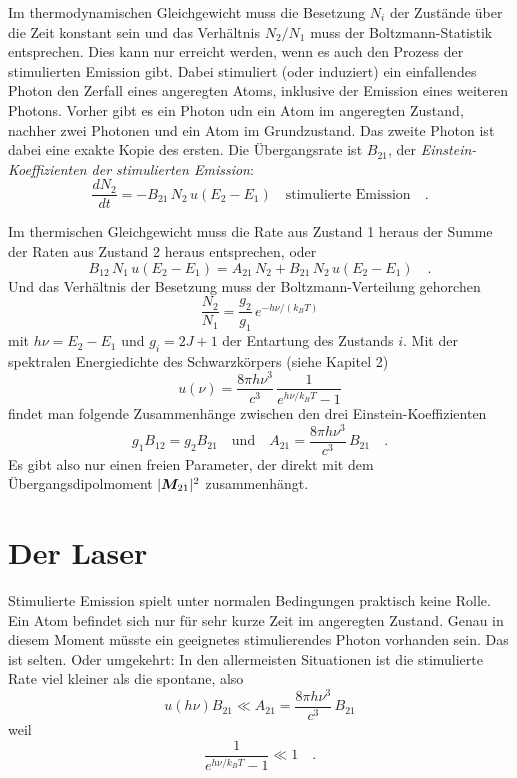 Im thermodynamischen Gleichgewicht muss die Besetzung $N_i$ der Zustände über die Zeit konstant sein und das Verhältnis $N_2 / N_1$ muss der Boltzmann-Statistik entsprechen. Dies kann nur erreicht werden, wenn es auch den  Prozess der stimulierten Emission gibt. Dabei stimuliert  (oder induziert) ein einfallendes Photon den Zerfall eines angeregten Atoms, inklusive der Emission eines weiteren Photons. Vorher gibt es ein Photon udn ein Atom im angeregten Zustand, nachher  zwei Photonen und ein Atom im Grundzustand. Das zweite Photon ist dabei eine exakte Kopie des ersten. Die Übergangsrate ist $B_{21}$, der  \emph{Einstein-Koeffizienten der stimulierten Emission}:
\begin{equation}
    \frac{d N_2}{dt} = - B_{21} \, N_2 \, u(E_2 - E_1)  \quad \text{stimulierte Emission}  \quad .\label{eq:7_k_stim}
\end{equation}


Im thermischen Gleichgewicht muss die Rate aus Zustand 1 heraus  der Summe der Raten aus Zustand 2 heraus entsprechen, 
oder 
\begin{equation}
    B_{12} \, N_1 \, u(E_2 - E_1) =   A_{21} \, N_2 + B_{21} \, N_2 \, u(E_2 - E_1)  \quad .
\end{equation}
Und das Verhältnis der Besetzung muss der Boltzmann-Verteilung gehorchen
\begin{equation}
    \frac{N_2}{N_1} = \frac{g_2}{g_1} \, e^{- h \nu / (k_B T)}
\end{equation}
mit $h \nu = E_2 - E_1$ und $g_i = 2J +1$ der Entartung des Zustands $i$. Mit der spektralen Energiedichte des Schwarzkörpers (siehe Kapitel 2)
\begin{equation}
    u(\nu) = \frac{8 \pi h \nu^3}{c^3} \,  \frac{1}{e^{h\nu/k_B T} -1}
\end{equation}
findet man folgende Zusammenhänge zwischen den drei Einstein-Koeffizienten
\begin{equation}
   g_1 B_{12}  = g_2 B_{21} \quad \text{und} \quad
   A_{21} = \frac{8 \pi h \nu^3}{c^3}\, B_{21}  \quad. 
\end{equation}
Es gibt also nur einen freien Parameter, der direkt mit dem Übergangsdipolmoment $|\boldsymbol{M}_{21}|^2$ zusammenhängt.


\section{Der Laser}

Stimulierte Emission spielt unter normalen Bedingungen praktisch keine Rolle. Ein Atom befindet sich nur für sehr kurze Zeit im angeregten Zustand. Genau in diesem Moment müsste ein geeignetes stimulierendes Photon vorhanden sein. Das ist selten. Oder umgekehrt: In den allermeisten Situationen ist die stimulierte Rate viel kleiner als die spontane, also 
\begin{equation}
    u(h\nu)  B_{21}  \ll A_{21} = \frac{8 \pi h \nu^3}{c^3} \, B_{21} 
\end{equation}
weil 
\begin{equation} 
    \frac{1}{e^{h\nu/k_B T} -1} \ll 1 \quad .
\end{equation}

